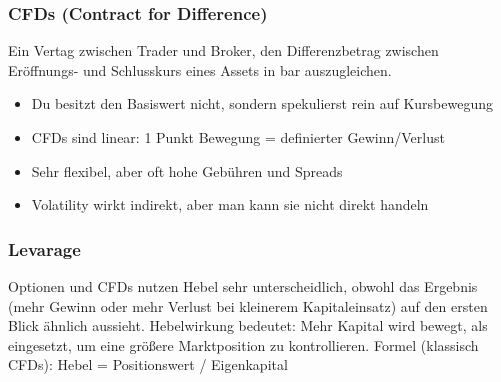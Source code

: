 \subsubsection{CFDs (Contract for Difference)}
Ein Vertag zwischen Trader und Broker, den Differenzbetrag zwischen Eröffnungs- und Schlusskurs eines Assets in bar auszugleichen.

\begin{itemize}
  \item Du besitzt den Basiswert nicht, sondern spekulierst rein auf Kursbewegung
  \item CFDs sind linear: 1 Punkt Bewegung = definierter Gewinn/Verlust
  \item Sehr flexibel, aber oft hohe Gebühren und Spreads
  \item Volatility wirkt indirekt, aber man kann sie nicht direkt handeln
\end{itemize}

\subsubsection{Levarage}
Optionen und CFDs nutzen Hebel sehr unterscheidlich, obwohl das Ergebnis (mehr Gewinn oder mehr Verlust bei kleinerem Kapitaleinsatz) auf den ersten Blick ähnlich aussieht.
Hebelwirkung bedeutet: Mehr Kapital wird bewegt, als eingesetzt, um eine größere Marktposition zu kontrollieren.
Formel (klassisch CFDs): Hebel = Positionswert / Eigenkapital